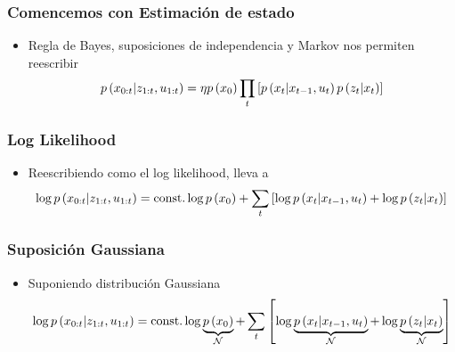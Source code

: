 \begin{frame}
    \frametitle{Comencemos con Estimación de estado}
    
    \begin{itemize}
        \item Regla de Bayes, suposiciones de independencia y Markov nos permiten reescribir
        \begin{equation*}
            p\left( x_{0:t} | z_{1:t}, u_{1:t} \right) = \eta p\left( x_{0} \right) \prod_{t} \left[ p\left( x_{t} | x_{t-1}, u_{t} \right) p\left( z_{t} | x_{t} \right) \right]
        \end{equation*}
    \end{itemize}
    
    
\end{frame}

\begin{frame}
    \frametitle{Log Likelihood}
    
    \begin{itemize}
        \item Reescribiendo como el log likelihood, lleva a
        \begin{equation*}
            \log p\left( x_{0:t} | z_{1:t}, u_{1:t} \right) = \text{const.}  \log p\left( x_{0} \right) + \sum_{t} \left[ \log p\left( x_{t} | x_{t-1}, u_{t} \right) + \log p\left( z_{t} | x_{t} \right) \right]
        \end{equation*}
    \end{itemize}
    
\end{frame}

\begin{frame}
    \frametitle{Suposición Gaussiana}
    
    \begin{itemize}
        \item Suponiendo distribución Gaussiana
        \begin{equation*}
            \log p\left( x_{0:t} | z_{1:t}, u_{1:t} \right) = \text{const.}  \log \underbrace{p\left( x_{0} \right)}_{\mathcal{N}} + \sum_{t} \left[ \log \underbrace{p\left( x_{t} | x_{t-1}, u_{t} \right)}_{\mathcal{N}} + \log \underbrace{p\left( z_{t} | x_{t} \right)}_{\mathcal{N}} \right]
        \end{equation*}
    \end{itemize}
    
\end{frame}

